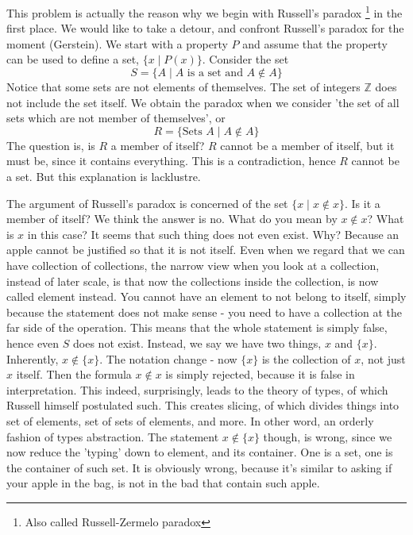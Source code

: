 This problem is actually the reason why we begin with Russell's paradox \footnote{Also called Russell-Zermelo paradox} in the first place. We would like to take a detour, and confront Russell's paradox for the moment (Gerstein). We start with a property $P$ and assume that the property can be used to define a set, $\{x\mid P(x)\}$. Consider the set 
\begin{equation*}
    S=\{A\mid A \text{ is a set and } A\not\in A\}
\end{equation*}
Notice that some sets are not elements of themselves. The set of integers $\mathbb{Z}$ does not include the set itself. We obtain the paradox when we consider 'the set of all sets which are not member of themselves', or 
\begin{equation*}
    R= \{\text{Sets } A \mid A \not\in A\}
\end{equation*}
The question is, is $R$ a member of itself? $R$ cannot be a member of itself, but it must be, since it contains everything. This is a contradiction, hence $R$ cannot be a set. But this explanation is lacklustre. 

The argument of Russell's paradox is concerned of the set $\{x\mid x\not\in x\}$. Is it a member of itself? We think the answer is no. What do you mean by $x\not\in x$? What is $x$ in this case? It seems that such thing does not even exist. Why? Because an apple cannot be justified so that it is not itself. Even when we regard that we can have collection of collections, the narrow view when you look at a collection, instead of later scale, is that now the collections inside the collection, is now called element instead. You cannot have an element to not belong to itself, simply because the statement does not make sense - you need to have a collection at the far side of the operation. This means that the whole statement is simply false, hence even $S$ does not exist. Instead, we say we have two things, $x$ and $\{x\}$. Inherently, $x\not\in \{x\}$. The notation change - now $\{x\}$ is the collection of $x$, not just $x$ itself. Then the formula $x\not\in x$ is simply rejected, because it is false in interpretation. This indeed, surprisingly, leads to the theory of types, of which Russell himself postulated such. This creates slicing, of which divides things into set of elements, set of sets of elements, and more. In other word, an orderly fashion of types abstraction. The statement $x\not\in \{x\}$ though, is wrong, since we now reduce the 'typing' down to element, and its container. One is a set, one is the container of such set. It is obviously wrong, because it's similar to asking if your apple in the bag, is not in the bad that contain such apple. 


